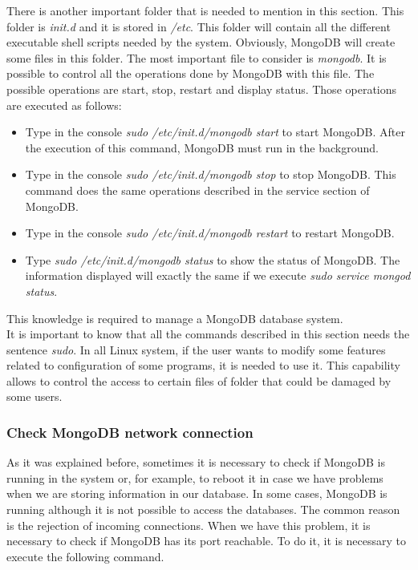 There is another important folder that is needed to mention in this section. This folder is \textit{init.d} and it is stored in \textit{/etc}. This folder will contain all the different executable shell scripts needed by the system. Obviously, MongoDB will create some files in this folder. The most important file to consider is \textit{mongodb}. It is possible to control all the operations done by MongoDB with this file. The possible operations are start, stop, restart and display status. Those operations are executed as follows:

\begin{itemize}

\item Type in the console \textit{sudo /etc/init.d/mongodb start} to start MongoDB. After the execution of this command, MongoDB must run in the background.

\item Type in the console \textit{sudo /etc/init.d/mongodb stop} to stop MongoDB. This command does the same operations described in the service section of MongoDB.

\item Type in the console \textit{sudo /etc/init.d/mongodb restart} to restart MongoDB.

\item Type \textit{sudo /etc/init.d/mongodb status} to show the status of MongoDB. The information displayed will exactly the same if we execute \textit{sudo service mongod status}.

\end{itemize}

This knowledge is required to manage a MongoDB database system.\\

It is important to know that all the commands described in this section needs the sentence \textit{sudo}. In all Linux system, if the user wants to modify some features related to configuration of some programs, it is needed to use it. This capability allows to control the access to certain files of folder that could be damaged by some users.

\subsubsection{Check MongoDB network connection}

As it was explained before, sometimes it is necessary to check if MongoDB is running in the system or, for example, to reboot it in case we have problems when we are storing information in our database. In some cases, MongoDB is running although it is not possible to access the databases. The common reason is the rejection of incoming connections. When we have this problem, it is necessary to check if MongoDB has its port reachable. To do it, it is necessary to execute the following command.\\

